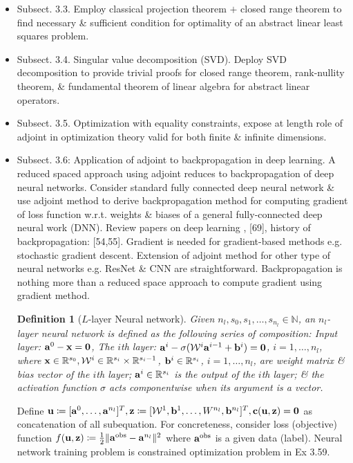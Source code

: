 \documentclass{article}
\newtheorem{definition}{Definition}
\begin{document}
\begin{enumerate}
\begin{itemize}
\begin{itemize}
			\item {\sf Subsect. 3.3.} Employ classical projection theorem $+$ closed range theorem to find necessary \& sufficient condition for optimality of an abstract linear least squares problem.
			
			\item {\sf Subsect. 3.4.} Singular value decomposition (SVD). Deploy SVD decomposition to provide trivial proofs for closed range theorem, rank-nullity theorem, \& fundamental theorem of linear algebra for abstract linear operators.
			
			\item {\sf Subsect. 3.5.} Optimization with equality constraints, expose at length role of adjoint in optimization theory valid for both finite \& infinite dimensions.
			
			\item {\sf Subsect. 3.6: Application of adjoint to backpropagation in deep learning.} A reduced spaced approach using adjoint reduces to backpropagation of deep neural networks. Consider standard fully connected deep neural network \& use adjoint method to derive backpropagation method for computing gradient of loss function w.r.t. weights \& biases of a general fully-connected deep neural work (DNN). Review papers on deep learning \cite{LeCun_Bengio_Hinton2015}, [69], history of backpropagation: [54,55]. Gradient is needed for gradient-based methods e.g. stochastic gradient descent. Extension of adjoint method for other type of neural networks e.g. ResNet \& CNN are straightforward. Backpropagation is nothing more than a reduced space approach to compute gradient using gradient method.
			
			\begin{definition}[$L$-layer Neural network]
				Given $n_l,s_0,s_1,\ldots,s_{n_l}\in\mathbb{N}$, an $n_l$-layer neural network is defined as the following series of composition: Input layer: ${\bf a}^0 - {\bf x} = {\bf0}$, The $i$th layer: ${\bf a}^i - \sigma(\mathcal{W}^i{\bf a}^{i-1} + {\bf b}^i) = {\bf0}$, $i = 1,\ldots,n_l$, where ${\bf x}\in\mathbb{R}^{s_0},\mathcal{W}^i\in\mathbb{R}^{s_i}\times\mathbb{R}^{s_i - 1}$, ${\bf b}^i\in\mathbb{R}^{s_i}$, $i = 1,\ldots,n_l$, are weight matrix \& bias vector of the $i$th layer; ${\bf a}^i\in\mathbb{R}^{s_i}$ is the output of the $i$th layer; \& the activation function $\sigma$ acts componentwise when its argument is a vector.
			\end{definition}
			Define ${\bf u}\coloneqq[{\bf a}^0,\ldots,{\bf a}^{n_l}]^T,{\bf z}\coloneqq[\mathcal{W}^1,{\bf b}^1,\ldots,W^{n_l},{\bf b}^{n_l}]^T,{\bf c}({\bf u},{\bf z}) = {\bf0}$ as concatenation of all subequation. For concreteness, consider loss (objective) function $f({\bf u},{\bf z})\coloneqq\frac{1}{2}\|{\bf a}^{\rm obs} - {\bf a}^{n_l}\|^2$ where ${\bf a}^{\rm obs}$ is a given data (label). Neural network training problem is constrained optimization problem in Ex 3.59.
			

\end{itemize}
\end{itemize}
\end{enumerate}
\end{document}
